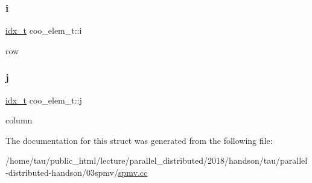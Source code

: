 \subsubsection{\texorpdfstring{i}{i}}
{\footnotesize\ttfamily \hyperlink{spmv_8cc_a8e93478a00e685bea5e6a3f617bf03a3}{idx\+\_\+t} coo\+\_\+elem\+\_\+t\+::i}

row \mbox{\label{structcoo__elem__t_a45a4cd1c7ffe70ddd75dff7c764bbfc6}} 
\subsubsection{\texorpdfstring{j}{j}}
{\footnotesize\ttfamily \hyperlink{spmv_8cc_a8e93478a00e685bea5e6a3f617bf03a3}{idx\+\_\+t} coo\+\_\+elem\+\_\+t\+::j}

column 

The documentation for this struct was generated from the following file\+:\begin{DoxyCompactItemize}
\item 
/home/tau/public\+\_\+html/lecture/parallel\+\_\+distributed/2018/handson/tau/parallel-\/distributed-\/handson/03spmv/\hyperlink{spmv_8cc}{spmv.\+cc}\end{DoxyCompactItemize}
